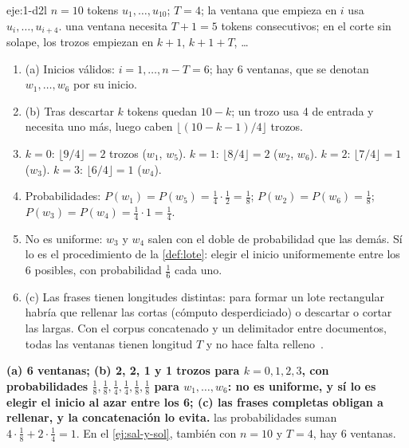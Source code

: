 \begin{solucion}{eje:1-d2l}
\datos $n=10$ tokens $u_1,\dots,u_{10}$; $T=4$; la ventana que empieza en $i$ usa $u_i,\dots,u_{i+4}$.
\planteamiento una ventana necesita $T+1=5$ tokens consecutivos; en el corte sin solape, los trozos empiezan en $k+1$, $k+1+T$, \dots
\pasos
\begin{enumerate}[label=\arabic*.]
  \item (a) Inicios válidos: $i=1,\dots,n-T=6$; hay 6 ventanas, que se denotan $w_1,\dots,w_6$ por su inicio.
  \item (b) Tras descartar $k$ tokens quedan $10-k$; un trozo usa 4 de entrada y necesita uno más, luego caben $\lfloor(10-k-1)/4\rfloor$ trozos.
  \item $k=0$: $\lfloor 9/4\rfloor=2$ trozos ($w_1$, $w_5$). $k=1$: $\lfloor 8/4\rfloor=2$ ($w_2$, $w_6$). $k=2$: $\lfloor 7/4\rfloor=1$ ($w_3$). $k=3$: $\lfloor 6/4\rfloor=1$ ($w_4$).
  \item Probabilidades: $P(w_1)=P(w_5)=\frac14\cdot\frac12=\frac18$; $P(w_2)=P(w_6)=\frac18$; $P(w_3)=P(w_4)=\frac14\cdot 1=\frac14$.
  \item No es uniforme: $w_3$ y $w_4$ salen con el doble de probabilidad que las demás. Sí lo es el procedimiento de la \cref{def:lote}: elegir el inicio uniformemente entre los 6 posibles, con probabilidad $\frac16$ cada uno.
  \item (c) Las frases tienen longitudes distintas: para formar un lote rectangular habría que rellenar las cortas (cómputo desperdiciado) o descartar o cortar las largas. Con el corpus concatenado y un delimitador entre documentos, todas las ventanas tienen longitud $T$ y no hace falta relleno~\cite[§5.1]{cs336}.
\end{enumerate}
\resultado \textbf{(a) 6 ventanas; (b) 2, 2, 1 y 1 trozos para $k=0,1,2,3$, con probabilidades $\frac18,\frac18,\frac14,\frac14,\frac18,\frac18$ para $w_1,\dots,w_6$: no es uniforme, y sí lo es elegir el inicio al azar entre los 6; (c) las frases completas obligan a rellenar, y la concatenación lo evita.}
\comprobacion las probabilidades suman $4\cdot\frac18+2\cdot\frac14=1$. En el \cref{ej:sal-y-sol}, también con $n=10$ y $T=4$, hay 6 ventanas.
\end{solucion}

